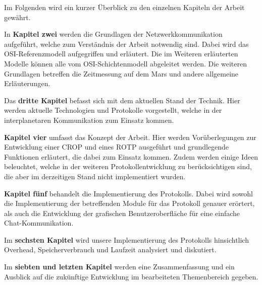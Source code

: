 Im Folgenden wird ein kurzer {\"U}berblick zu den einzelnen
Kapiteln der Arbeit gew{\"a}hrt.

In \textbf{Kapitel zwei} werden die Grundlagen der Netzwerkkommunikation
aufgef{\"u}hrt, welche zum Verst{\"a}ndnis der Arbeit notwendig sind. Dabei wird
\zB das OSI-Referenzmodell aufgegriffen und erl{\"a}utert. Die im Weiteren
erl{\"a}uterten Modelle k{\"o}nnen alle vom OSI-Schichtenmodell abgeleitet
werden. Die weiteren Grundlagen betreffen die Zeitmessung auf dem Mars und
andere allgemeine Erl{\"a}uterungen.

Das \textbf{dritte Kapitel} befasst sich mit dem aktuellen Stand der Technik.
Hier werden aktuelle Technologien und Protokolle vorgestellt, welche in der
interplanetaren Kommunikation zum Einsatz kommen.

\textbf{Kapitel vier} umfasst das Konzept der Arbeit. Hier werden
Vor{\"u}berlegungen zur Entwicklung einer \gls{CROP} und eines \gls{ROTP}
ausgef{\"u}hrt und grundlegende Funktionen erl{\"a}utert, die dabei zum Einsatz kommen.
Zudem werden einige Ideen beleuchtet, welche in der weiteren
Protokollentwicklung zu ber{\"u}cksichtigen sind, die aber im derzeitigen Stand
nicht implementiert wurden.

\textbf{Kapitel f{\"u}nf} behandelt die Implementierung des Protokolls. Dabei
wird sowohl die Implementierung der betreffenden Module für das Protokoll
genauer er{\"o}rtert, als auch die Entwicklung der grafischen
Benutzeroberfläche f{\"u}r eine einfache Chat-Kommunikation.

Im \textbf{sechsten Kapitel} wird unsere Implementierung des Protokolls
hinsichtlich Overhead, Speicherverbrauch und Laufzeit analysiert und diskutiert.

Im \textbf{siebten und letzten Kapitel} werden eine Zusammenfassung und ein
Ausblick auf die zuk{\"u}nftige Entwicklung im bearbeiteten Themenbereich gegeben.

